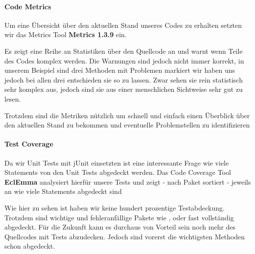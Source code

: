 \paragraph{Code Metrics}

Um eine Übersicht über den aktuellen Stand unseres Codes zu erhalten setzten wir das Metrics Tool \textbf{Metrics 1.3.9} ein. 


Es zeigt eine Reihe an Statistiken über den Quellcode an und warnt wenn Teile des Codes komplex werden. 
Die Warnungen sind jedoch nicht immer korrekt, in unserem Beispiel sind drei Methoden mit Problemen markiert wir haben uns jedoch bei allen drei entschieden sie so zu lassen. Zwar sehen sie rein statistisch sehr komplex aus, jedoch sind sie aus einer menschlichen Sichtweise sehr gut zu lesen.

Trotzdem sind die Metriken nützlich um schnell und einfach einen Überblick über den aktuellen Stand zu bekommen und eventuelle Problemstellen zu identifizieren

\paragraph{Test Coverage}

Da wir Unit Tests mit jUnit einsetzten ist eine interessante Frage wie viele Statements von den Unit Tests abgedeckt werden.
Das Code Coverage Tool \textbf{EclEmma} analysiert hierfür unsere Tests und zeigt - nach Paket sortiert - jeweils an wie viele Statements abgedeckt sind


Wie hier zu sehen ist haben wir keine hundert prozentige Testabdeckung. Trotzdem sind wichtige und fehleranfällige Pakete wie ,  oder  fast vollständig abgedeckt.
Für die Zukunft kann es durchaus von Vorteil sein noch mehr des Quellcodes mit Tests abzudecken. Jedoch sind vorerst die wichtigsten Methoden schon abgedeckt.